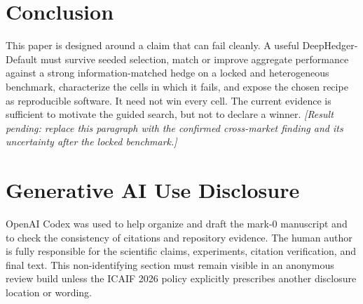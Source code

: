 \documentclass[sigconf,balance=false]{acmart}
\newcommand{\methodname}{DeepHedger-Default}
\newcommand{\todoresult}[1]{\textit{[Result pending: #1]}}
\begin{document}
\section{Conclusion}

This paper is designed around a claim that can fail cleanly.  A useful
\methodname{} must survive seeded selection, match or improve aggregate
performance against a strong information-matched hedge on a locked and
heterogeneous benchmark, characterize the cells in which it fails, and expose
the chosen recipe as reproducible software.  It need not win every cell.  The
current evidence is sufficient to motivate the guided search, but not to
declare a winner.
\todoresult{replace this paragraph with the confirmed cross-market finding and
its uncertainty after the locked benchmark.}

\section*{Generative AI Use Disclosure}

OpenAI Codex was used to help organize and draft the mark-0 manuscript and to
check the consistency of citations and repository evidence.  The human author
is fully responsible for the scientific claims, experiments, citation
verification, and final text.  This non-identifying section must remain visible
in an anonymous review build unless the ICAIF 2026 policy explicitly prescribes
another disclosure location or wording.



\end{document}
